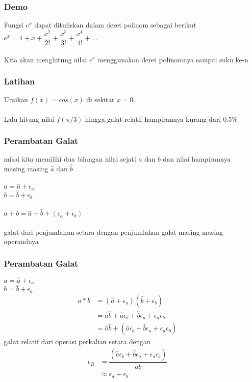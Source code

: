 \documentclass{beamer}
\begin{document}

\begin{frame}
\frametitle{Demo}
Fungsi $e^x$ dapat dituliskan dalam deret polinom sebagai berikut
$e^x = 1+x+ \dfrac{x^2}{2!} + \dfrac{x^3}{3!} + \dfrac{x^4}{4!} + \dots $
\\\ \\Kita akan menghitung nilai $e^x$ menggunakan deret polinomnya sampai suku ke-n
\end{frame}


\begin{frame}
\frametitle{Latihan}
Uraikan $f(x) = cos(x)$ di sekitar $x=0$. \\\ \\Lalu hitung nilai $f(\pi/3)$ hingga galat relatif hampirannya kurang dari 0.5\%
\end{frame}


\begin{frame}
\frametitle{Perambatan Galat}
misal kita memiliki dua bilangan nilai sejati $a$ dan $b$ dan nilai hampirannya masing masing $\hat{a}$ dan $\hat{b}$
\\\ \\$a= \hat{a} + \epsilon_a$
\\$b = \hat{b} + \epsilon_b$
\\\ \\$a+b = \hat{a} + \hat{b} + (\epsilon_a + \epsilon_b)$
\\\ \\galat dari penjumlahan setara dengan penjumlahan galat masing masing operandnya
\end{frame}


\begin{frame}
\frametitle{Perambatan Galat}
$a= \hat{a} + \epsilon_a$
\\$b = \hat{b} + \epsilon_b$
\\\begin{equation}
\begin{split}
a*b &= (\hat{a} + \epsilon_a) (\hat{b} + \epsilon_b)
\\&= \hat{a}\hat{b} + \hat{a}\epsilon_b + \hat{b}\epsilon_a +\epsilon_a\epsilon_b
\\&= \hat{a}\hat{b} + (\hat{a}\epsilon_b + \hat{b}\epsilon_a +\epsilon_a\epsilon_b)
\end{split}
\nonumber
\end{equation}
galat relatif dari operasi perkalian setara dengan 
\begin{equation}
\begin{split}
\epsilon_R &= \dfrac{(\hat{a}\epsilon_b + \hat{b}\epsilon_a +\epsilon_a\epsilon_b)}{ab}
\\&\approx \epsilon_a + \epsilon_b
\end{split}
\nonumber
\end{equation}
\end{frame}
\end{document}
